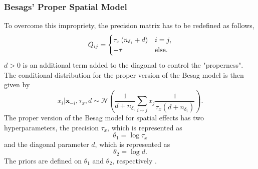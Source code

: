 \subsubsection{Besags' Proper Spatial Model}
To overcome this impropriety, the precision matrix has to be redefined as follows,
\begin{equation}
    Q_{ij} = \begin{cases}
    \tau_x\left(n_{\delta_i}+d\right) & i=j,\\
    -\tau &\hbox{else.}
    \end{cases}
\end{equation}
$d > 0$  is an additional term added to the diagonal to control the "properness". The conditional distribution for the proper version of the Besag model is then given by
\begin{equation}
    x_i|\pmb{x}_{-i},\tau_x,d\sim\mathcal{N}\left(\frac{1}{d+n_{\delta_i}}\sum_{i\sim j}x_j\frac{1}{\tau_x\left(d+n_{\delta_i}\right)}\right).
\end{equation}
The proper version of the Besag model for spatial effects has two hyperparameters, the precision $\tau_x$, which is represented as
\begin{equation}
    \theta_1 = \log\tau_x
\end{equation}
and the diagonal parameter $d$, which is represented as
\begin{equation}
    \theta_2 = \log d.
\end{equation}
The priors are defined on $\theta_1$ and $\theta_2$, respectively \autocite[][]{besag1974spatial, riebler2016intuitive}.
